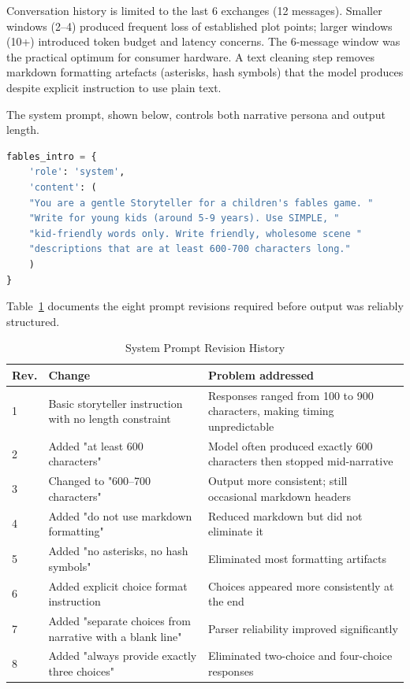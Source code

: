\documentclass[12pt,a4paper]{article}
\begin{document}
Conversation history is limited to the last 6 exchanges (12 messages). Smaller windows (2--4) produced frequent loss of established plot points; larger windows (10+) introduced token budget and latency concerns. The 6-message window was the practical optimum for consumer hardware. A text cleaning step removes markdown formatting artefacts (asterisks, hash symbols) that the model produces despite explicit instruction to use plain text.

The system prompt, shown below, controls both narrative persona and output length.

\begin{lstlisting}[language=Python, caption={System prompt configuration for AI storyteller}, basicstyle=\ttfamily\footnotesize, showspaces=false, showstringspaces=false]
fables_intro = {
    'role': 'system',
    'content': (
    "You are a gentle Storyteller for a children's fables game. "
    "Write for young kids (around 5-9 years). Use SIMPLE, "
    "kid-friendly words only. Write friendly, wholesome scene "
    "descriptions that are at least 600-700 characters long."
    )
}
    \end{lstlisting}

Table~\ref{tab:prompt_iterations} documents the eight prompt revisions required before output was reliably structured.

\begin{table}[H]
\centering
\caption{System Prompt Revision History}
\label{tab:prompt_iterations}
\begin{tabular}{p{}p{}p{}}
\toprule
\textbf{Rev.} & \textbf{Change} & \textbf{Problem addressed} \\
\midrule
1 & Basic storyteller instruction with no length constraint & Responses ranged from 100 to 900 characters, making timing unpredictable \\
2 & Added "at least 600 characters" & Model often produced exactly 600 characters then stopped mid-narrative \\
3 & Changed to "600--700 characters" & Output more consistent; still occasional markdown headers \\
4 & Added "do not use markdown formatting" & Reduced markdown but did not eliminate it \\
5 & Added "no asterisks, no hash symbols" & Eliminated most formatting artifacts \\
6 & Added explicit choice format instruction & Choices appeared more consistently at the end \\
7 & Added "separate choices from narrative with a blank line" & Parser reliability improved significantly \\
8 & Added "always provide exactly three choices" & Eliminated two-choice and four-choice responses \\
\bottomrule
\end{tabular}
\end{table}
\end{document}
